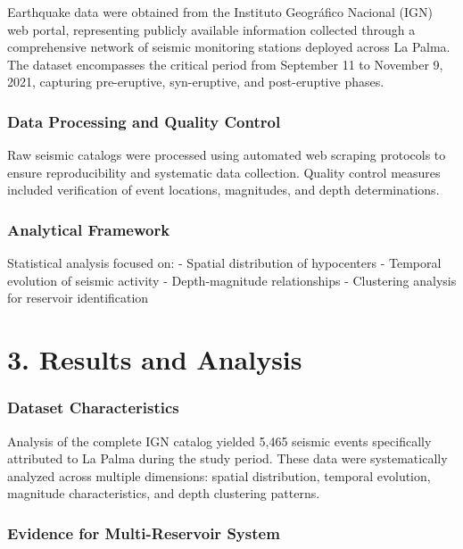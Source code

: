 \documentclass[
  letterpaper,
]{article}
\begin{document}
Earthquake data were obtained from the Instituto Geográfico Nacional
(IGN) web portal, representing publicly available information collected
through a comprehensive network of seismic monitoring stations deployed
across La Palma. The dataset encompasses the critical period from
September 11 to November 9, 2021, capturing pre-eruptive, syn-eruptive,
and post-eruptive phases.

\subsection{Data Processing and Quality
Control}\label{data-processing-and-quality-control}

Raw seismic catalogs were processed using automated web scraping
protocols to ensure reproducibility and systematic data collection.
Quality control measures included verification of event locations,
magnitudes, and depth determinations.

\subsection{Analytical Framework}\label{analytical-framework}

Statistical analysis focused on: - Spatial distribution of hypocenters -
Temporal evolution of seismic activity - Depth-magnitude relationships -
Clustering analysis for reservoir identification


\chapter{3. Results and Analysis}\label{results-and-analysis}

\subsection{Dataset Characteristics}\label{dataset-characteristics}

Analysis of the complete IGN catalog yielded 5,465 seismic events
specifically attributed to La Palma during the study period. These data
were systematically analyzed across multiple dimensions: spatial
distribution, temporal evolution, magnitude characteristics, and depth
clustering patterns.

\subsection{Evidence for Multi-Reservoir
System}\label{evidence-for-multi-reservoir-system}
\end{document}
